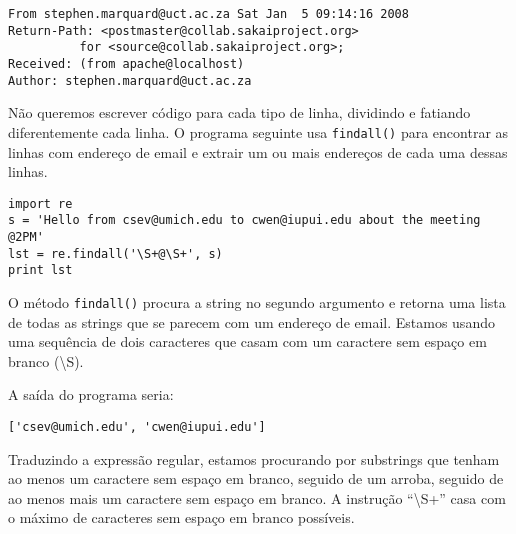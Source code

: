 \beforeverb
\begin{verbatim}
From stephen.marquard@uct.ac.za Sat Jan  5 09:14:16 2008
Return-Path: <postmaster@collab.sakaiproject.org>
          for <source@collab.sakaiproject.org>;
Received: (from apache@localhost)
Author: stephen.marquard@uct.ac.za
\end{verbatim}
\afterverb
%

Não queremos escrever código para cada tipo de linha, dividindo e fatiando diferentemente cada linha.
O programa seguinte usa {\tt findall()} para encontrar as linhas com endereço de email e extrair um 
ou mais endereços de cada uma dessas linhas.

\beforeverb
\begin{verbatim}
import re
s = 'Hello from csev@umich.edu to cwen@iupui.edu about the meeting @2PM'
lst = re.findall('\S+@\S+', s)
print lst
\end{verbatim}
\afterverb
%

O método {\tt findall()} procura a string no segundo argumento e retorna uma lista de todas
as strings que se parecem com um endereço de email. Estamos usando uma sequência de dois 
caracteres que casam com um caractere sem espaço em branco ({\textbackslash}S).

A saída do programa seria:

\beforeverb
\begin{verbatim}
['csev@umich.edu', 'cwen@iupui.edu']
\end{verbatim}
\afterverb
%

Traduzindo a expressão regular, estamos procurando por substrings que tenham ao menos um caractere 
sem espaço em branco, seguido de um arroba, seguido de ao menos mais um caractere sem espaço em 
branco. A instrução ``{\textbackslash}S+'' casa com o máximo de caracteres sem espaço em branco 
possíveis. 

